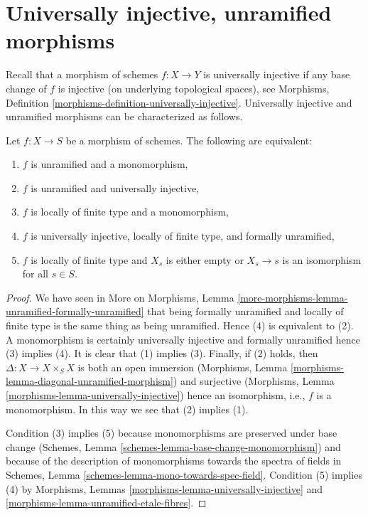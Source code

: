 \section{Universally injective, unramified morphisms}
\label{section-universally-injective-unramified}

\noindent
Recall that a morphism of schemes $f : X \to Y$ is universally
injective if any base change of $f$ is injective (on underlying
topological spaces), see
Morphisms, Definition \ref{morphisms-definition-universally-injective}.
Universally injective and unramified morphisms can be
characterized as follows.

\begin{lemma}
\label{lemma-universally-injective-unramified}
Let $f : X \to S$ be a morphism of schemes.
The following are equivalent:
\begin{enumerate}
\item $f$ is unramified and a monomorphism,
\item $f$ is unramified and universally injective,
\item $f$ is locally of finite type and a monomorphism,
\item $f$ is universally injective, locally of finite type, and
formally unramified,
\item $f$ is locally of finite type and $X_s$ is either empty
or $X_s \to s$ is an isomorphism for all $s \in S$.
\end{enumerate}
\end{lemma}

\begin{proof}
We have seen in
More on Morphisms, Lemma
\ref{more-morphisms-lemma-unramified-formally-unramified}
that being formally unramified and locally of finite type is the same thing
as being unramified. Hence (4) is equivalent to (2).
A monomorphism is certainly universally injective and
formally unramified hence (3) implies (4).
It is clear that (1) implies (3). Finally, if (2) holds, then
$\Delta : X \to X \times_S X$ is both an open immersion
(Morphisms, Lemma \ref{morphisms-lemma-diagonal-unramified-morphism})
and surjective
(Morphisms, Lemma \ref{morphisms-lemma-universally-injective})
hence an isomorphism, i.e., $f$ is a monomorphism. In this way we see that
(2) implies (1).

\medskip\noindent
Condition (3) implies (5) because monomorphisms are preserved under
base change
(Schemes, Lemma \ref{schemes-lemma-base-change-monomorphism})
and because of the description of monomorphisms towards the spectra of fields
in
Schemes, Lemma \ref{schemes-lemma-mono-towards-spec-field}.
Condition (5) implies (4) by
Morphisms, Lemmas \ref{morphisms-lemma-universally-injective} and
\ref{morphisms-lemma-unramified-etale-fibres}.
\end{proof}

